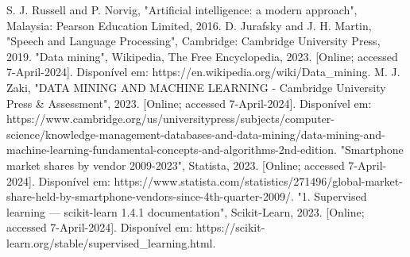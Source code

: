 \documentclass[conference]{IEEEtran}
\begin{document}
\begin{thebibliography}{00}
     S. J. Russell and P. Norvig, "Artificial intelligence: a modern approach", Malaysia: Pearson Education Limited, 2016.
     D. Jurafsky and J. H. Martin, "Speech and Language Processing", Cambridge: Cambridge University Press, 2019.
     "Data mining", Wikipedia, The Free Encyclopedia, 2023. [Online; accessed 7-April-2024]. Disponível em: https://en.wikipedia.org/wiki/Data_mining.
     M. J. Zaki, "DATA MINING AND MACHINE LEARNING - Cambridge University Press & Assessment", 2023. [Online; accessed 7-April-2024]. Disponível em: https://www.cambridge.org/us/universitypress/subjects/computer-science/knowledge-management-databases-and-data-mining/data-mining-and-machine-learning-fundamental-concepts-and-algorithms-2nd-edition.
     "Smartphone market shares by vendor 2009-2023", Statista, 2023. [Online; accessed 7-April-2024]. Disponível em: https://www.statista.com/statistics/271496/global-market-share-held-by-smartphone-vendors-since-4th-quarter-2009/.
     "1. Supervised learning — scikit-learn 1.4.1 documentation", Scikit-Learn, 2023. [Online; accessed 7-April-2024]. Disponível em: https://scikit-learn.org/stable/supervised_learning.html.

    
\end{thebibliography}
\end{document}
